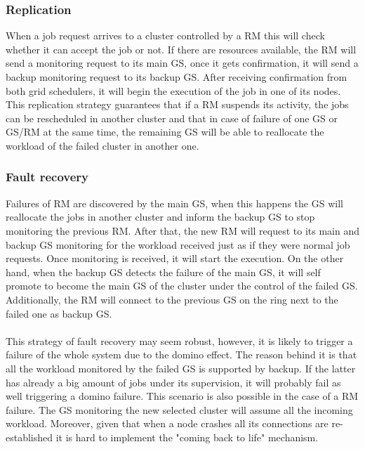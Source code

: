 \subsubsection{Replication}
When a job request arrives to a cluster controlled by a RM this will check whether it can accept the job or not. If there are resources available, the RM will send a monitoring request to its main GS, once it gets confirmation, it will send a backup monitoring request to its backup GS. After receiving confirmation from both grid schedulers, it will begin the execution of the job in one of its nodes. This replication strategy guarantees that if a RM suspends its activity, the jobs can be rescheduled in another cluster and that in case of failure of one GS or GS/RM at the same time, the remaining GS will be able to reallocate the workload of the failed cluster in another one.

\subsubsection{Fault recovery}
Failures of RM are discovered by the main GS, when this happens the GS will reallocate the jobs in another cluster and inform the backup GS to stop monitoring the previous RM. After that, the new RM will request to its main and backup GS monitoring for the workload received just as if they were normal job requests. Once monitoring is received, it will start the execution.
On the other hand, when the backup GS detects the failure of the main GS, it will self promote to become the main GS of the cluster under the control of the failed GS. Additionally, the RM will connect to the previous GS on the ring next to the failed one as backup GS.
\\\\
This strategy of fault recovery may seem robust, however, it is likely to trigger a failure of the whole system due to the domino effect. The reason behind it is that all the workload monitored by the failed GS is supported by backup. If the latter has already a big amount of jobs under its supervision, it will probably fail as well triggering a domino failure. This scenario is also possible in the case of a RM failure. The GS monitoring the new selected cluster will assume all the incoming workload. Moreover, given that when a node crashes all its connections are re-established it is hard to implement the "coming back to life" mechanism.
